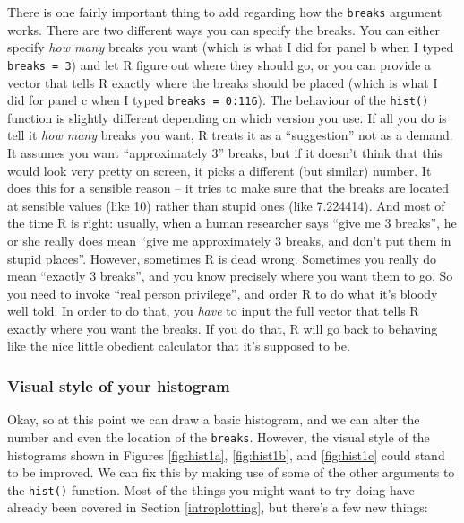 \documentclass[
]{book}
\begin{document}
There is one fairly important thing to add regarding how the \texttt{breaks} argument works. There are two different ways you can specify the breaks. You can either specify \emph{how many} breaks you want (which is what I did for panel b when I typed \texttt{breaks\ =\ 3}) and let R figure out where they should go, or you can provide a vector that tells R exactly where the breaks should be placed (which is what I did for panel c when I typed \texttt{breaks\ =\ 0:116}). The behaviour of the \texttt{hist()} function is slightly different depending on which version you use. If all you do is tell it \emph{how many} breaks you want, R treats it as a ``suggestion'' not as a demand. It assumes you want ``approximately 3'' breaks, but if it doesn't think that this would look very pretty on screen, it picks a different (but similar) number. It does this for a sensible reason -- it tries to make sure that the breaks are located at sensible values (like 10) rather than stupid ones (like 7.224414). And most of the time R is right: usually, when a human researcher says ``give me 3 breaks'', he or she really does mean ``give me approximately 3 breaks, and don't put them in stupid places''. However, sometimes R is dead wrong. Sometimes you really do mean ``exactly 3 breaks'', and you know precisely where you want them to go. So you need to invoke ``real person privilege'', and order R to do what it's bloody well told. In order to do that, you \emph{have} to input the full vector that tells R exactly where you want the breaks. If you do that, R will go back to behaving like the nice little obedient calculator that it's supposed to be.

\hypertarget{visual-style-of-your-histogram}{%
\subsubsection{Visual style of your histogram}\label{visual-style-of-your-histogram}}

Okay, so at this point we can draw a basic histogram, and we can alter the number and even the location of the \texttt{breaks}. However, the visual style of the histograms shown in Figures \ref{fig:hist1a}, \ref{fig:hist1b}, and \ref{fig:hist1c} could stand to be improved. We can fix this by making use of some of the other arguments to the \texttt{hist()} function. Most of the things you might want to try doing have already been covered in Section \ref{introplotting}, but there's a few new things:
\end{document}
